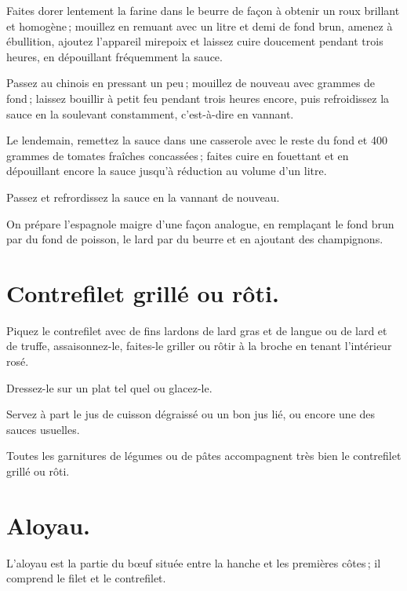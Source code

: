 Faites dorer lentement la farine dans le beurre de façon à obtenir un roux
brillant et homogène ; mouillez en remuant avec un litre et demi de fond brun,
amenez à ébullition, ajoutez l'appareil mirepoix et laissez cuire doucement
pendant trois heures, en dépouillant fréquemment la sauce.

Passez au chinois en pressant un peu ; mouillez de nouveau avec {\mmm} grammes de
fond ; laissez bouillir à petit feu pendant trois heures encore, puis
refroidissez la sauce en la soulevant constamment, c'est-à-dire en vannant.

Le lendemain, remettez la sauce dans une casserole avec le reste du fond et 400
grammes de tomates fraîches concassées ; faites cuire en fouettant et en
dépouillant encore la sauce jusqu'à réduction au volume d'un litre.

Passez et refrordissez la sauce en la vannant de nouveau.

\sk

On prépare l'espagnole maigre d'une façon analogue, en remplaçant le fond brun
par du fond de poisson, le lard par du beurre et en ajoutant des champignons.

\section*{\centering Contrefilet grillé ou rôti.}
{}

Piquez le contrefilet avec de fins lardons de lard gras et de langue ou de lard
et de truffe, assaisonnez-le, faites-le griller ou rôtir à la broche en tenant
l'intérieur rosé.

Dressez-le sur un plat tel quel ou glacez-le.

Servez à part le jus de cuisson dégraissé ou un bon jus lié, ou encore une des
sauces usuelles.

Toutes les garnitures de légumes ou de pâtes accompagnent très bien le
contrefilet grillé ou rôti.

\section*{\centering Aloyau.}
{}

L'aloyau est la partie du bœuf située entre la hanche et les premières côtes ;
il comprend le filet et le contrefilet.

